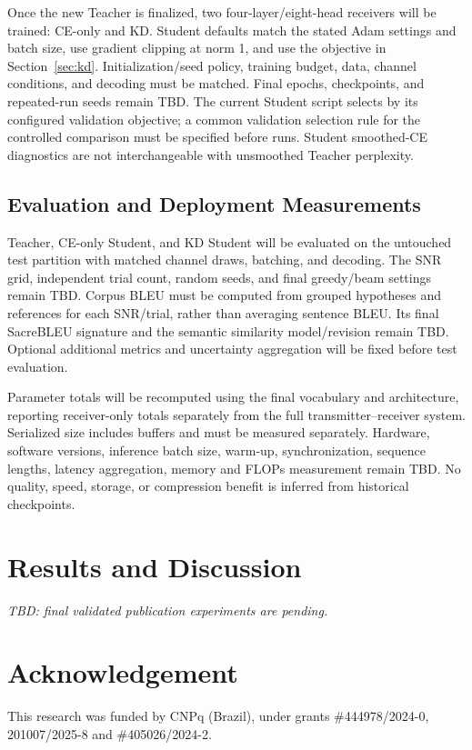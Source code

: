 \documentclass[conference]{IEEEtran}
\begin{document}
Once the new Teacher is finalized, two four-layer/eight-head receivers will be trained: CE-only and KD. Student defaults match the stated Adam settings and batch size, use gradient clipping at norm 1, and use the objective in Section~\ref{sec:kd}. Initialization/seed policy, training budget, data, channel conditions, and decoding must be matched. Final epochs, checkpoints, and repeated-run seeds remain TBD. The current Student script selects by its configured validation objective; a common validation selection rule for the controlled comparison must be specified before runs. Student smoothed-CE diagnostics are not interchangeable with unsmoothed Teacher perplexity.

\subsection{Evaluation and Deployment Measurements}
Teacher, CE-only Student, and KD Student will be evaluated on the untouched test partition with matched channel draws, batching, and decoding. The SNR grid, independent trial count, random seeds, and final greedy/beam settings remain TBD. Corpus BLEU must be computed from grouped hypotheses and references for each SNR/trial, rather than averaging sentence BLEU. Its final SacreBLEU signature and the semantic similarity model/revision remain TBD. Optional additional metrics and uncertainty aggregation will be fixed before test evaluation.

Parameter totals will be recomputed using the final vocabulary and architecture, reporting receiver-only totals separately from the full transmitter--receiver system. Serialized size includes buffers and must be measured separately. Hardware, software versions, inference batch size, warm-up, synchronization, sequence lengths, latency aggregation, memory and FLOPs measurement remain TBD. No quality, speed, storage, or compression benefit is inferred from historical checkpoints.

\section{Results and Discussion}
\label{sec:results}
\textit{TBD: final validated publication experiments are pending.}

\section*{Acknowledgement}
This research was funded by CNPq (Brazil), under grants \#444978/2024-0, 201007/2025-8 and \#405026/2024-2.





\end{document}
